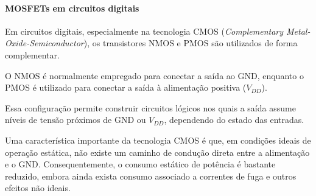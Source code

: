 \paragraph{MOSFETs em circuitos digitais}

Em circuitos digitais, especialmente na tecnologia CMOS (\textit{Complementary Metal-Oxide-Semiconductor}), os transistores NMOS e PMOS são utilizados de forma complementar.

O NMOS é normalmente empregado para conectar a saída ao GND, enquanto o PMOS é utilizado para conectar a saída à alimentação positiva ($V_{DD}$).

Essa configuração permite construir circuitos lógicos nos quais a saída assume níveis de tensão próximos de GND ou $V_{DD}$, dependendo do estado das entradas.

Uma característica importante da tecnologia CMOS é que, em condições ideais de operação estática, não existe um caminho de condução direta entre a alimentação e o GND. Consequentemente, o consumo estático de potência é bastante reduzido, embora ainda exista consumo associado a correntes de fuga e outros efeitos não ideais.
